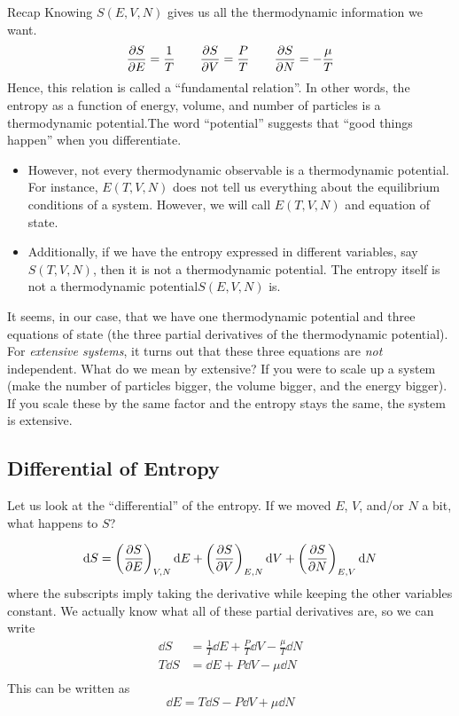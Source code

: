 \documentclass[a4paper,twoside,master.tex]{subfiles}
\begin{document}
\begin{note}{Recap}
    Knowing $ S(E,V,N) $ gives us all the thermodynamic information we want.
    \begin{equation}
        \pdv{S}{E} = \frac{1}{T} \qquad \pdv{S}{V} = \frac{P}{T} \qquad \pdv{S}{N} = - \frac{\mu}{T}
    \end{equation}
    Hence, this relation is called a ``fundamental relation''. In other words, the entropy as a function of energy, volume, and number of particles is a thermodynamic potential.The word ``potential'' suggests that ``good things happen'' when you differentiate.
    \begin{itemize}
        \item However, not every thermodynamic observable is a thermodynamic potential. For instance, $ E(T,V,N) $ does not tell us everything about the equilibrium conditions of a system. However, we will call $ E(T,V,N) $ and equation of state.
        \item Additionally, if we have the entropy expressed in different variables, say $ S(T,V,N) $, then it is not a thermodynamic potential. The entropy itself is not a thermodynamic potential\textemdash $ S(E,V,N) $ is.
    \end{itemize}
\end{note}
It seems, in our case, that we have one thermodynamic potential and three equations of state (the three partial derivatives of the thermodynamic potential). For \textit{extensive systems}, it turns out that these three equations are \textit{not} independent. What do we mean by extensive? If you were to scale up a system (make the number of particles bigger, the volume bigger, and the energy bigger). If you scale these by the same factor and the entropy stays the same, the system is extensive.

\subsection{Differential of Entropy}
\label{sub:differential_of_entropy}

Let us look at the ``differential'' of the entropy. If we moved $ E $, $ V $, and/or $ N $ a bit, what happens to $ S $?

\begin{equation}
    \dd{S} = \left( \pdv{S}{E} \right)_{V,N} \dd{E} + \left( \pdv{S}{V} \right)_{E,N} \dd{V} + \left( \pdv{S}{N} \right)_{E,V} \dd{N}
\end{equation}
where the subscripts imply taking the derivative while keeping the other variables constant. We actually know what all of these partial derivatives are, so we can write
\begin{align}
    \dd{S} &= \frac{1}{T} \dd{E} + \frac{P}{T} \dd{V} - \frac{\mu}{T} \dd{N} \\
    T \dd{S} &= \dd{E} + P \dd{V} - \mu \dd{N} \\
\end{align}
This can be written as
\begin{equation}
    \dd{E} = T \dd{S} - P \dd{V} + \mu \dd{N}
\end{equation}
\end{document}
